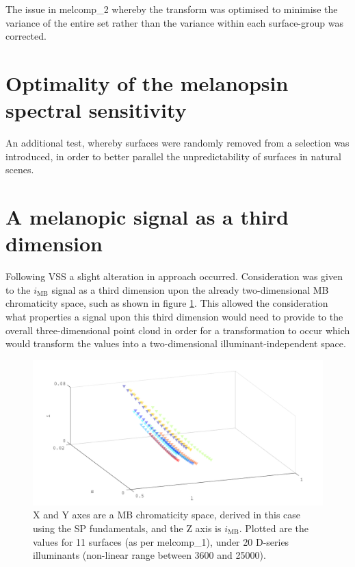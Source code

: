The issue in melcomp\_2 whereby the transform was optimised to minimise the variance of the entire set rather than the variance within each surface-group was corrected.

\section{Optimality of the melanopsin spectral sensitivity}

An additional test, whereby surfaces were randomly removed from a selection was introduced, in order to better parallel the unpredictability of surfaces in natural scenes.


\section{A melanopic signal as a third dimension}

Following VSS a slight alteration in approach occurred. Consideration was given to the $i_{\text{MB}}$ signal as a third dimension upon the already two-dimensional \gls{MB} chromaticity space, such as shown in figure \ref{fig:ZL}. This allowed the consideration what properties a signal upon this third dimension would need to provide to the overall three-dimensional point cloud in order for a transformation to occur which would transform the values into a two-dimensional illuminant-independent space.

\begin{figure}[htbp]
 \includegraphics[max width=\textwidth]{figs/comp/melcomp_2/ZL.pdf}
 \caption{X and Y axes are a \gls{MB} chromaticity space, derived in this case using the \gls{SP} fundamentals, and the Z axis is $i_{\text{MB}}$. Plotted are the values for 11 surfaces (as per melcomp\_1), under 20 D-series illuminants (non-linear range between 3600 and 25000).}
 \label{fig:ZL}
\end{figure} %

